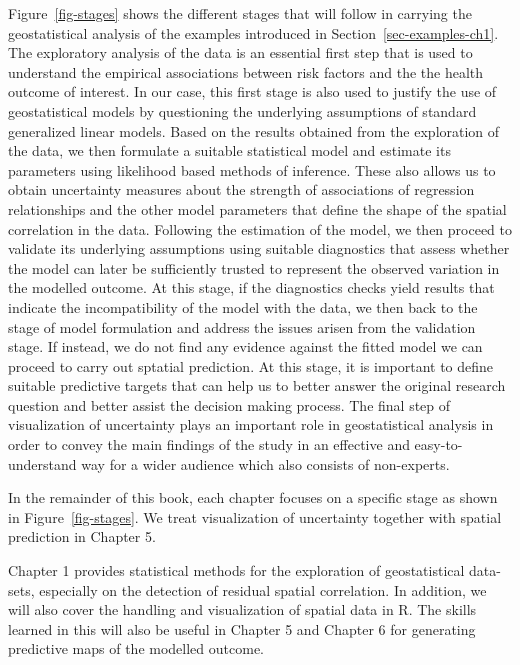 \documentclass[
  letterpaper,
]{krantz}
\begin{document}
Figure~\ref{fig-stages} shows the different stages that will follow in
carrying the geostatistical analysis of the examples introduced in
Section~\ref{sec-examples-ch1}. The exploratory analysis of the data is
an essential first step that is used to understand the empirical
associations between risk factors and the the health outcome of
interest. In our case, this first stage is also used to justify the use
of geostatistical models by questioning the underlying assumptions of
standard generalized linear models. Based on the results obtained from
the exploration of the data, we then formulate a suitable statistical
model and estimate its parameters using likelihood based methods of
inference. These also allows us to obtain uncertainty measures about the
strength of associations of regression relationships and the other model
parameters that define the shape of the spatial correlation in the data.
Following the estimation of the model, we then proceed to validate its
underlying assumptions using suitable diagnostics that assess whether
the model can later be sufficiently trusted to represent the observed
variation in the modelled outcome. At this stage, if the diagnostics
checks yield results that indicate the incompatibility of the model with
the data, we then back to the stage of model formulation and address the
issues arisen from the validation stage. If instead, we do not find any
evidence against the fitted model we can proceed to carry out sptatial
prediction. At this stage, it is important to define suitable predictive
targets that can help us to better answer the original research question
and better assist the decision making process. The final step of
visualization of uncertainty plays an important role in geostatistical
analysis in order to convey the main findings of the study in an
effective and easy-to-understand way for a wider audience which also
consists of non-experts.

In the remainder of this book, each chapter focuses on a specific stage
as shown in Figure~\ref{fig-stages}. We treat visualization of
uncertainty together with spatial prediction in Chapter 5.

Chapter 1 provides statistical methods for the exploration of
geostatistical data-sets, especially on the detection of residual
spatial correlation. In addition, we will also cover the handling and
visualization of spatial data in R. The skills learned in this will also
be useful in Chapter 5 and Chapter 6 for generating predictive maps of
the modelled outcome.
\end{document}

